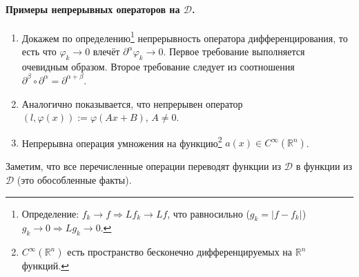\paragraph{Примеры непрерывных операторов на $ \mathcal D $.} 
\begin{enumerate}
  \item Докажем по определению\footnote{Определение: $ f_k \to f
      \Rightarrow Lf_k \to Lf $, что равносильно ($ g_k = |f - f_k| $) $ g_k \to 0
    \Rightarrow Lg_k \to 0 $.} непрерывность оператора дифференцирования, то есть
    что $ \varphi_k \to 0 $ влечёт $
    \partial^\alpha\varphi_k \to 0 $. Первое требование выполняется очевидным
    образом. Второе требование следует из соотношения $ \partial^\beta \circ
    \partial^\alpha = \partial^{\alpha + \beta} $.
  \item Аналогично показывается, что непрерывен оператор $ (l, \varphi(x)) :=
    \varphi(Ax + B) $, $ A \neq 0 $.
  \item  Непрерывна операция умножения на функцию\footnote{$C^\infty(\mathbb
      R^n)$ есть
    пространство бесконечно дифференцируемых на $ \mathbb R^n $ функций.} $
  a(x)\in C^\infty(\mathbb R^n) $.
\end{enumerate}
Заметим, что все перечисленные операции переводят функции из $ \mathcal D $ в
функции из $ \mathcal D $ (это обособленные факты).
